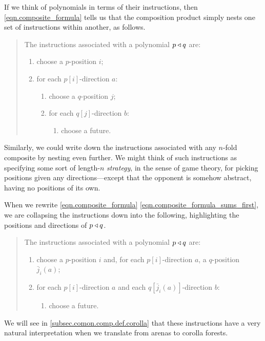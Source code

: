 \documentclass[Book-Poly]{subfiles}
\begin{document}
If we think of polynomials in terms of their instructions, then \eqref{eqn.composite_formula} tells us that the composition product simply nests one set of instructions within another, as follows.
\begin{quote}
The instructions associated with a polynomial $p\mathbin{\triangleleft} q$ are:
\begin{enumerate}
    \item choose a $p$-position $i$;
    \item for each $p[i]$-direction $a$:
    \begin{enumerate}[label*=\arabic*.]
        \item choose a $q$-position $j$;
        \item for each $q[j]$-direction $b$:
        \begin{enumerate}[label*=\arabic*.]
            \item choose a future.
        \end{enumerate}
    \end{enumerate}
\end{enumerate}
\end{quote}
Similarly, we could write down the instructions associated with any $n$-fold composite by nesting even further.
We might think of such instructions as specifying some sort of length-$n$ \emph{strategy}, in the sense of game theory, for picking positions given any directions---except that the opponent is somehow abstract, having no positions of its own.

When we rewrite \eqref{eqn.composite_formula} \eqref{eqn.composite_formula_sums_first}, we are collapsing the instructions down into the following, highlighting the positions and directions of $p\mathbin{\triangleleft} q$.
\begin{quote}
The instructions associated with a polynomial $p\mathbin{\triangleleft} q$ are:
\begin{enumerate}
    \item choose a $p$-position $i$ and, for each $p[i]$-direction $a$, a $q$-position $\bar{j}_i(a)$;
    \item for each $p[i]$-direction $a$ and each $q[\bar{j}_i(a)]$-direction $b$:
    \begin{enumerate}[label*=\arabic*.]
        \item choose a future.
    \end{enumerate}
\end{enumerate}
\end{quote}
We will see in \cref{subsec.comon.comp.def.corolla} that these instructions have a very natural interpretation when we translate from arenas to corolla forests.
\end{document}
